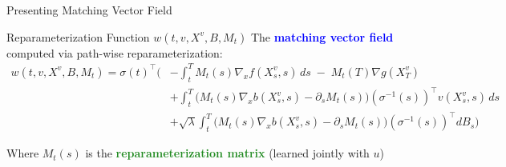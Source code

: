 \documentclass[aspectratio=169,xcolor=dvipsnames]{beamer}
\begin{document}
\begin{frame}{Presenting Matching Vector Field}
    \vspace{-0.3cm}
    
    \begin{block}{Reparameterization Function $w(t, v, X^v, B, M_t)$}
        \small
        The \textcolor{blue}{\textbf{matching vector field}} computed via path-wise reparameterization:
        \vspace{-0.2cm}
        \begin{equation}
        \begin{aligned}
        w(t, v, X^v, B, M_t) 
        = \sigma(t)^\top \Bigg(
        &- \int_t^T M_t(s) \nabla_x f(X_s^v, s)\, ds 
           \;-\; M_t(T)\nabla g(X_T^v) \\[4pt]
        &+ \int_t^T \big(M_t(s)\nabla_x b(X_s^v, s) - \partial_s M_t(s)\big)(\sigma^{-1}(s))^\top v(X_s^v, s)\, ds \\[4pt]
        &+ \sqrt{\lambda} \int_t^T \big(M_t(s)\nabla_x b(X_s^v, s) - \partial_s M_t(s)\big)(\sigma^{-1}(s))^\top dB_s
        \Bigg)
        \end{aligned}
        \end{equation}
        
        Where $M_t(s)$ is the \textcolor{ForestGreen}{\textbf{reparameterization matrix}} (learned jointly with $u$)
    \end{block}

\end{frame}
\end{document}

